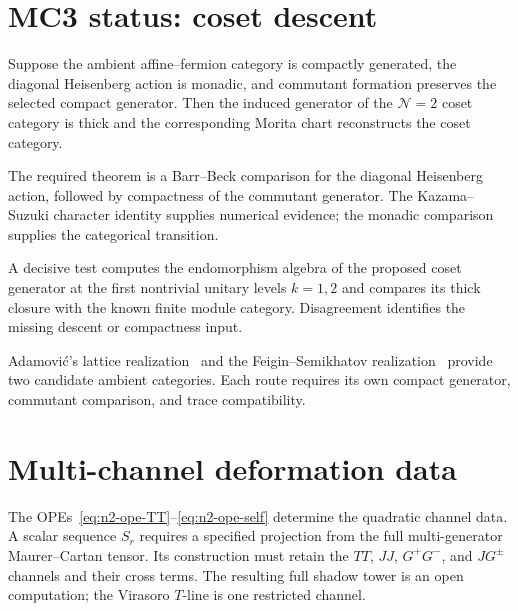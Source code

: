 \section{MC3 status: coset descent}
\label{sec:n2-mc3-status}

\begin{conjecture}
\label{conj:mc3-n2-sca-kazama-suzuki}
Suppose the ambient affine--fermion category is compactly generated,
the diagonal Heisenberg action is monadic, and commutant formation
preserves the selected compact generator.  Then the induced generator
of the $\mathcal N=2$ coset category is thick and the corresponding
Morita chart reconstructs the coset category.
\end{conjecture}

\begin{remark}
\label{rem:n2-mc3-coset-obstruction}
The required theorem is a Barr--Beck comparison for the diagonal
Heisenberg action, followed by compactness of the commutant generator.
The Kazama--Suzuki character identity supplies numerical evidence;
the monadic comparison supplies the categorical transition.
\end{remark}

\begin{remark}
\label{rem:n2-mc3-falsification}
A decisive test computes the endomorphism algebra of the proposed
coset generator at the first nontrivial unitary levels $k=1,2$ and
compares its thick closure with the known finite module category.
Disagreement identifies the missing descent or compactness input.
\end{remark}

\begin{remark}
\label{rem:n2-mc3-alternative-routes}
Adamovi\'c's lattice realization~\cite{Adamovic1999} and the
Feigin--Semikhatov realization~\cite{FeiginSemikhatov2004} provide two
candidate ambient categories.  Each route requires its own compact
generator, commutant comparison, and trace compatibility.
\end{remark}

\section{Multi-channel deformation data}
\label{sec:n2-multi-channel-shadow}

\begin{remark}
\label{rem:n2-shadow-tower}
The OPEs~\eqref{eq:n2-ope-TT}--\eqref{eq:n2-ope-self} determine the
quadratic channel data.  A scalar sequence $S_r$ requires a specified
projection from the full multi-generator Maurer--Cartan tensor.  Its
construction must retain the $TT$, $JJ$, $G^+G^-$, and $JG^\pm$
channels and their cross terms.  The resulting full shadow tower is
an open computation; the Virasoro $T$-line is one restricted channel.
\end{remark}

